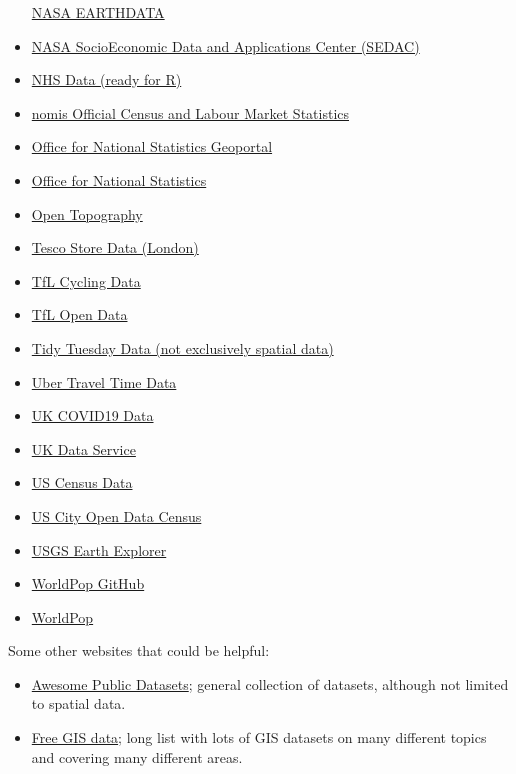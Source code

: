 \documentclass[
]{book}
\providecommand{\tightlist}{%
  \setlength{\itemsep}{0pt}\setlength{\parskip}{0pt}}
\begin{document}
\begin{itemize}
  \href{https://earthdata.nasa.gov/}{NASA EARTHDATA}
\item
  \href{https://sedac.ciesin.columbia.edu/}{NASA SocioEconomic Data and Applications Center (SEDAC)}
\item
  \href{https://nhs-r-community.github.io/NHSRdatasets/}{NHS Data (ready for R)}
\item
  \href{https://www.nomisweb.co.uk/}{nomis Official Census and Labour Market Statistics}
\item
  \href{https://geoportal.statistics.gov.uk/}{Office for National Statistics Geoportal}
\item
  \href{https://www.ons.gov.uk/}{Office for National Statistics}
\item
  \href{https://opentopography.org/}{Open Topography}
\item
  \href{https://www.nature.com/articles/s41597-020-0397-7}{Tesco Store Data (London)}
\item
  \href{https://cycling.data.tfl.gov.uk/}{TfL Cycling Data}
\item
  \href{https://tfl.gov.uk/info-for/open-data-users/our-open-data?intcmp=3671\#on-this-page-2}{TfL Open Data}
\item
  \href{https://github.com/rfordatascience/tidytuesday}{Tidy Tuesday Data (not exclusively spatial data)}
\item
  \href{https://movement.uber.com/?lang=en-GB}{Uber Travel Time Data}
\item
  \href{https://coronavirus.data.gov.uk/}{UK COVID19 Data}
\item
  \href{https://ukdataservice.ac.uk/}{UK Data Service}
\item
  \href{https://www.census.gov/data.html}{US Census Data}
\item
  \href{http://us-cities.survey.okfn.org/}{US City Open Data Census}
\item
  \href{https://earthexplorer.usgs.gov/}{USGS Earth Explorer}
\item
  \href{https://github.com/wpgp}{WorldPop GitHub}
\item
  \href{https://www.worldpop.org/}{WorldPop}
\end{itemize}

Some other websites that could be helpful:

\begin{itemize}
\tightlist
\item
  \href{https://github.com/awesomedata/awesome-public-datasets}{Awesome Public Datasets}; general collection of datasets, although not limited to spatial data.
\item
  \href{https://freegisdata.rtwilson.com/}{Free GIS data}; long list with lots of GIS datasets on many different topics and covering many different areas.
\end{itemize}
\end{document}
